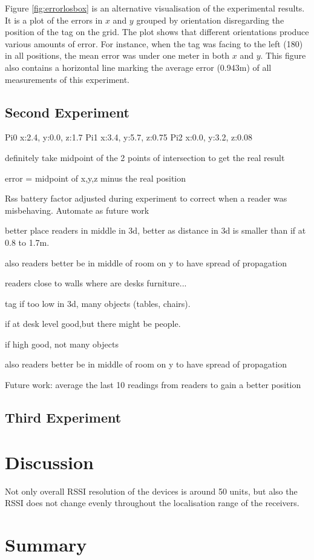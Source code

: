 Figure \ref{fig:errorlosbox} is an alternative visualisation of the experimental results. It is a plot of the errors in $x$ and $y$ grouped by orientation disregarding the position of the tag on the grid. The plot shows that different orientations produce various amounts of error. For instance, when the tag was facing to the left (180\textdegree) in all positions, the mean error was under one meter in both $x$ and $y$. This figure also contains a horizontal line marking the average error (0.943m) of all measurements of this experiment.


\subsection{Second Experiment}

Pi0 x:2.4, y:0.0, z:1.7
Pi1 x:3.4, y:5.7, z:0.75
Pi2 x:0.0, y:3.2, z:0.08

definitely take midpoint of the 2 points of intersection to get the real result

error = midpoint of x,y,z minus the real position

Rss battery factor adjusted during experiment to correct when a reader was misbehaving. Automate as future work

better place readers in middle in 3d, better as distance in 3d is smaller than if at 0.8 to 1.7m.

also readers better be in middle of room on y to have spread of propagation \/

readers close to walls where are desks furniture... 

tag if too low in 3d, many objects (tables, chairs).

if at desk level good,but there might be people.

if high good, not many objects

also readers better be in middle of room on y to have spread of propagation \/

Future work: average the last 10 readings from readers to gain a better position

\subsection{Third Experiment}

\section{Discussion}

Not only overall RSSI resolution of the devices is around 50 units, but also the RSSI does not change evenly throughout the localisation range of the receivers. 

\section{Summary}
